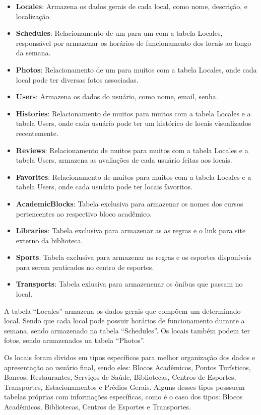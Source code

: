     \begin{itemize}
        \item \textbf{Locales}: Armazena os dados gerais de cada local, como nome, descrição, e localização.
        \item \textbf{Schedules}: Relacionamento de um para um com a tabela Locales, responsável por armazenar os horários de funcionamento dos locais ao longo da semana.
        \item \textbf{Photos}: Relacionamento de um para muitos com a tabela Locales, onde cada local pode ter diversas fotos associadas.
        \item \textbf{Users}: Armazena os dados do usuário, como nome, email, senha.
        \item \textbf{Histories}: Relacionamento de muitos para muitos com a tabela Locales e a tabela Users, onde cada usuário pode ter um histórico de locais visualizados recentemente.
        \item \textbf{Reviews}: Relacionamento de muitos para muitos com a tabela Locales e a tabela Users, armazena as avaliações de cada usuário feitas aos locais.
        \item \textbf{Favorites}: Relacionamento de muitos para muitos com a tabela Locales e a tabela Users, onde cada usuário pode ter locais favoritos.
        \item \textbf{AcademicBlocks}: Tabela exclusiva para armazenar os nomes dos cursos pertencentes ao respectivo bloco acadêmico.
        \item \textbf{Libraries}: Tabela exclusiva para armazenar as as regras e o link para site externo da biblioteca.
        \item \textbf{Sports}: Tabela exclusiva para armazenar as regras e os esportes disponíveis para serem praticados no centro de esportes.
        \item \textbf{Transports}: Tabela exlusiva para armazenenar os ônibus que passam no local.
    \end{itemize}

    A tabela ``Locales'' armazena os dados gerais que compõem um determinado local. Sendo que cada local pode possuir horários de funcionamento durante a semana, sendo armazenado na tabela ``Schedules''. Os locais também podem ter fotos, sendo armazenados na tabela ``Photos''.
    
    Os locais foram dividos em tipos específicos para melhor organização dos dados e apresentação ao usuário final, sendo eles: Blocos Acadêmicos, Pontos Turísticos, Bancos, Restaurantes, Serviços de Saúde, Bibliotecas, Centros de Esportes, Transportes, Estacionamentos e Prédios Gerais. Alguns desses tipos posssuem tabelas próprias com informações específicas, como é o caso dos tipos: Blocos Acadêmicos, Bibliotecas, Centros de Esportes e Transportes. 
    
